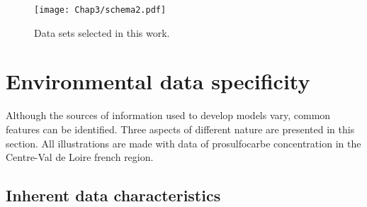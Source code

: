 \begin{figure}[ht]
    \centering
    \texttt{[image: Chap3/schema2.pdf]}
    \caption{Data sets selected in this work.}
    \label{fig:compartments_choice}
\end{figure}


\section{Environmental data specificity}

Although the sources of information used to develop models vary, common features can be identified. Three aspects of different nature are presented in this section. All illustrations are made with data of prosulfocarbe concentration in the Centre-Val de Loire french region. 

\subsection{Inherent data characteristics}




